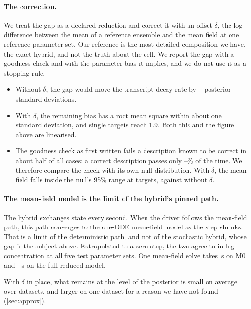 \paragraph{The correction.} We treat the gap as a declared reduction and correct it
with an offset $\delta$, the log difference between the mean of a reference
ensemble and the mean field at one reference parameter set. Our reference is the
most detailed composition we have, the exact hybrid, and not the truth about the
cell. We report the gap with a goodness check and with the parameter bias it
implies, and we do not use it as a stopping rule.
\begin{itemize}
  \item Without $\delta$, the gap would move the transcript decay rate by
  -- posterior standard deviations.
  \item With $\delta$, the remaining bias has a root mean square within about one standard deviation, and single targets reach 1.9. Both this and the figure above are linearised.
  \item The goodness check as first written fails a description known to be correct
  in about half of all cases: a correct description passes only
  --\% of the time. We therefore compare the check
  with its own null distribution. With $\delta$, the mean field falls inside the
  null's 95\% range at  targets, against  without
  $\delta$.
\end{itemize}

\paragraph{The mean-field model is the limit of the hybrid's pinned path.} The hybrid exchanges state every second. When the driver follows the mean-field path, this path converges to the one-ODE mean-field model as the step shrinks. That is a limit of the deterministic path, and not of the stochastic hybrid, whose gap is the subject above. Extrapolated to a zero step, the two agree to
 in log concentration at all five test parameter sets. One
mean-field solve takes \,s on M0 and --\,s
on the full reduced model.

With $\delta$ in place, what remains at the level of the posterior is small on
average over datasets, and larger on one dataset for a reason we have not found
(\cref{sec:approx}).

